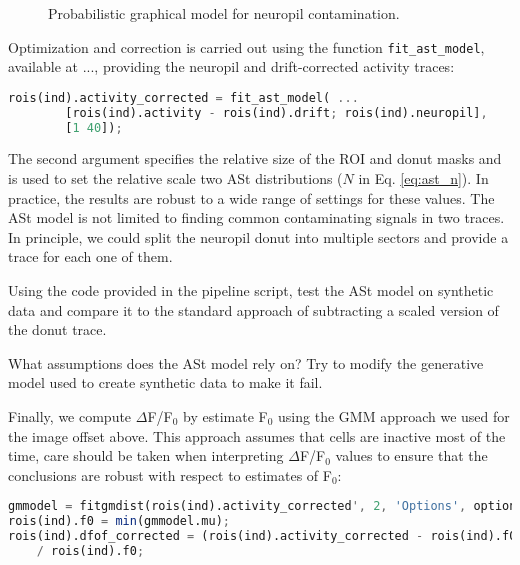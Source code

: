 \documentclass[a4paper]{report}
\newcommand{\nexercise}[0]{\arabic{exercises}\addtocounter{exercises}{1}}
\begin{document}
\begin{figure}[b]
  \centering
  \caption{Probabilistic graphical model for neuropil contamination.}
  \label{fig:neuropil}
\end{figure}

Optimization and correction is carried out using the function \texttt{fit\_ast\_model}, available at ..., providing the neuropil and drift-corrected activity traces: 
\begin{lstlisting}[language=Octave]
rois(ind).activity_corrected = fit_ast_model( ...
        [rois(ind).activity - rois(ind).drift; rois(ind).neuropil], 
        [1 40]);
\end{lstlisting}

The second argument specifies the relative size of the ROI and donut masks and is used to set the relative scale two ASt distributions ($N$ in Eq. \ref{eq:ast_n}). 
In practice, the results are robust to a wide range of settings for these values. 
The ASt model is not limited to finding common contaminating signals in two traces. 
In principle, we could split the neuropil donut into multiple sectors and provide a trace for each one of them.
\begin{exercisebox}[frametitle={Exercise \nexercise: Test ASt model on synthetic data}]
Using the code provided in the pipeline script, test the ASt model on synthetic data and compare it to the standard approach of subtracting a scaled version of the donut trace.

What assumptions does the ASt model rely on? Try to modify the generative model used to create synthetic data to make it fail.
\end{exercisebox}

Finally, we compute $\Delta$F/F$_0$ by estimate F$_0$ using the GMM approach we used for the image offset above. This approach assumes that cells are inactive most of the time, care should be taken when interpreting $\Delta$F/F$_0$ values to ensure that the conclusions are robust with respect to estimates of F$_0$:
\begin{lstlisting}[language=Octave]
gmmodel = fitgmdist(rois(ind).activity_corrected', 2, 'Options', options);
rois(ind).f0 = min(gmmodel.mu);
rois(ind).dfof_corrected = (rois(ind).activity_corrected - rois(ind).f0) ...
    / rois(ind).f0;  
\end{lstlisting}
\end{document}
